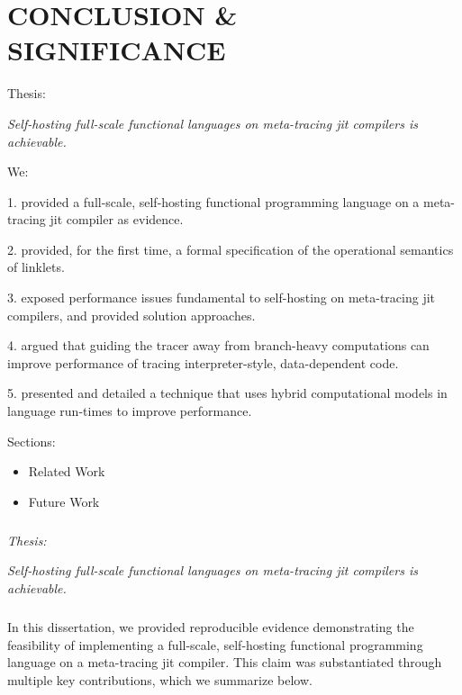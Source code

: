 \chapter[\texorpdfstring{CONCLUSION \& SIGNIFICANCE}
                          {8. Conclusion}]{CONCLUSION \& SIGNIFICANCE}

    \label{chapter:conclusion}

    \begin{chaptersynopsis}
        \footnotesize

        Thesis:

        \textit{Self-hosting full-scale functional languages on meta-tracing \gls{jit} compilers is achievable.}

        We:

        1. provided a full-scale, self-hosting functional programming language on a meta-tracing \gls{jit} compiler as evidence.

        2. provided, for the first time, a formal specification of the operational semantics of linklets.

        3. exposed performance issues fundamental to self-hosting on meta-tracing \gls{jit} compilers, and provided solution approaches.

        4. argued that guiding the tracer away from branch-heavy computations can improve performance of tracing interpreter-style, data-dependent code.

        5. presented and detailed a technique that uses hybrid computational models in language run-times to improve performance.

        \vspace{2em}

        Sections:
		\begin{itemize}
			\item Related Work
			\item Future Work
		\end{itemize}
    \end{chaptersynopsis}

    \paragraph{} \textit{Thesis:}

    \textit{Self-hosting full-scale functional languages on meta-tracing \gls{jit} compilers is achievable.}

    \paragraph{}%
        In this dissertation, we provided reproducible evidence demonstrating the feasibility of implementing a full-scale, self-hosting functional programming language on a meta-tracing \gls{jit} compiler. This claim was substantiated through multiple key contributions, which we summarize below.

